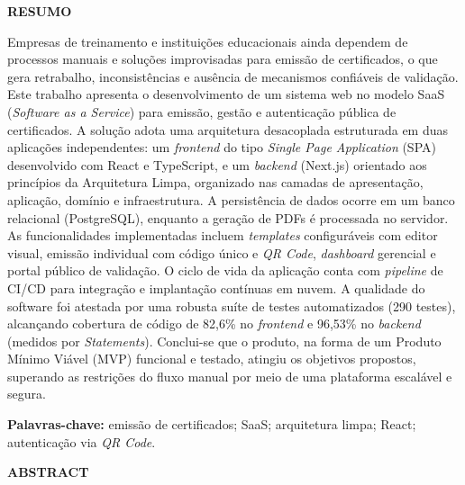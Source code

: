 \begin{center}
\textbf{RESUMO}
\end{center}

Empresas de treinamento e instituições educacionais ainda dependem de processos manuais e soluções improvisadas para emissão de certificados, o que gera retrabalho, inconsistências e ausência de mecanismos confiáveis de validação. Este trabalho apresenta o desenvolvimento de um sistema web no modelo SaaS (\textit{Software as a Service}) para emissão, gestão e autenticação pública de certificados. A solução adota uma arquitetura desacoplada estruturada em duas aplicações independentes: um \textit{frontend} do tipo \textit{Single Page Application} (SPA) desenvolvido com React e TypeScript, e um \textit{backend} (Next.js) orientado aos princípios da Arquitetura Limpa, organizado nas camadas de apresentação, aplicação, domínio e infraestrutura. A persistência de dados ocorre em um banco relacional (PostgreSQL), enquanto a geração de PDFs é processada no servidor. As funcionalidades implementadas incluem \textit{templates} configuráveis com editor visual, emissão individual com código único e \textit{QR Code}, \textit{dashboard} gerencial e portal público de validação. O ciclo de vida da aplicação conta com \textit{pipeline} de CI/CD para integração e implantação contínuas em nuvem. A qualidade do software foi atestada por uma robusta suíte de testes automatizados (290 testes), alcançando cobertura de código de 82,6\% no \textit{frontend} e 96,53\% no \textit{backend} (medidos por \textit{Statements}). Conclui-se que o produto, na forma de um Produto Mínimo Viável (MVP) funcional e testado, atingiu os objetivos propostos, superando as restrições do fluxo manual por meio de uma plataforma escalável e segura.

\noindent\textbf{Palavras-chave:} emissão de certificados; SaaS; arquitetura limpa; React; autenticação via \textit{QR Code}.

\newpage
\begin{center}
\textbf{ABSTRACT}
\end{center}

